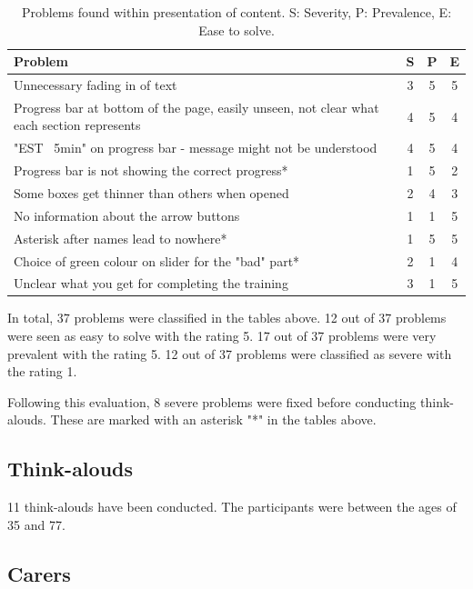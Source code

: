 \documentclass{sigchi}
\begin{document}
\begin{table}[H]
    \centering
    \begin{tabular}{|m{6.5cm}|c|c|c|}
    \hline
        \textbf{Problem} & \textbf{S} & \textbf{P} & \textbf{E}\\
    \hline
         Unnecessary fading in of text & 3 & 5 & 5\\
    \hline
         Progress bar at bottom of the page, easily unseen, not clear what each section represents & 4 & 5 & 4\\
    \hline
         "EST ~5min" on progress bar - message might not be understood & 4 & 5 & 4\\
    \hline
         Progress bar is not showing the correct progress* & 1 & 5 & 2\\
    \hline
         Some boxes get thinner than others when opened & 2 & 4 & 3\\
    \hline
         No information about the arrow buttons & 1 & 1 & 5\\
    \hline
         Asterisk after names lead to nowhere* & 1 & 5 & 5\\
    \hline
         Choice of green colour on slider for the "bad" part* & 2 & 1 & 4\\
    \hline
         Unclear what you get for completing the training & 3 & 1 & 5\\
    \hline
    \end{tabular}
    \caption{Problems found within presentation of content. S: Severity, P: Prevalence, E: Ease to solve.}
    \label{tab:content}
\end{table}

In total, 37 problems were classified in the tables above. 12 out of 37 problems were seen as easy to solve with the rating 5. 17 out of 37 problems were very prevalent with the rating 5. 12 out of 37 problems were classified as severe with the rating 1. 

Following this evaluation, 8 severe problems were fixed before conducting think-alouds. These are marked with an asterisk "*" in the tables above.

\subsection{Think-alouds}
11 think-alouds have been conducted. The participants were between the ages of 35 and 77.

\subsection{Carers}
\end{document}
